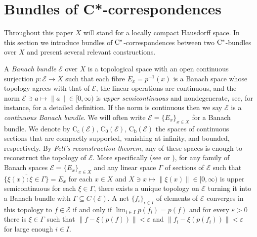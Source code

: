 \documentclass[11 pt, leqno]{amsart}
\numberwithin{equation}{section}
\theoremstyle{plain}
\theoremstyle{definition}
\newcommand*{\contc}{\mathrm{C_c}}%
\newcommand*{\contz}{\mathrm{C_0}}%
\newcommand*{\contb}{\mathrm{C_b}}%
\newcommand{\EE}{\mathcal E}
\newcommand{\cst}{\ifmmode\mathrm{C}^*\else{$\mathrm{C}^*$}\fi}
\begin{document}


%
%
\section{Bundles of C*-correspondences} 
\label{Sec:bundles}

Throughout this paper $X$ will stand for a locally compact Hausdorff space.
In this section we introduce bundles of $\cst$-correspondences between two $\cst$-bundles over $X$ and present several relevant constructions.

A \emph{Banach bundle} $\EE$ over $X$ is a topological space with an open continuous surjection $p:\EE\to X$ such that each fibre $E_x=p^{-1}(x)$ is a Banach space whose topology agrees with that of $\EE$, the linear operations are continuous, and the norm $\EE\ni a\mapsto \|a\| \in [0,\infty)$ is \emph{upper semicontinuous} and nondegenerate, see, for instance, \cite[Definition 2.1]{BussExel} for a detailed definition. 
If the norm is continuous then we say $\EE$ is a \emph{continuous Banach bundle}. 
We will often write $\EE=\{E_x\}_{x\in X}$ for a Banach bundle. 
We denote by $\contc(\EE)$,  $\contz(\EE)$, $\contb(\EE)$  the spaces of continuous sections that are compactly supported,  vanishing at infinity, and bounded, respectively. 
By \emph{Fell's reconstruction theorem}, any of these spaces is enough to reconstruct the topology of $\EE$. 
More specifically (see \cite[Theorem II.13.18]{Fell_Doran} or \cite[Proposition 2.4]{BussExel}), for any family of Banach spaces $\EE=\{E_x\}_{x\in X}$ and any linear space $\Gamma$ of sections of $\EE$ such that $\overline{\{\xi (x): \xi \in \Gamma\}}=E_x$ for each $x\in X$ and $X\ni x\mapsto \|\xi(x)\|\in [0,\infty)$ is upper semicontinuous for each $\xi\in \Gamma$, there exists a unique topology on $\EE$ turning it into a Banach bundle with $\Gamma\subseteq C(\EE)$. 
A net $\{f_i\}_{i \in I}$ of elements of $ \EE$ converges in this topology to $f\in \EE$ if and only if $\lim_{i \in I}p(f_i)= p(f)$ and for every $\varepsilon>0$ there is $\xi\in \Gamma$  such that $\|f-\xi(p(f))\| < \varepsilon$ and $\|f_i-\xi(p(f_i))\|<\varepsilon$ for large enough $i \in I$.
\end{document}
